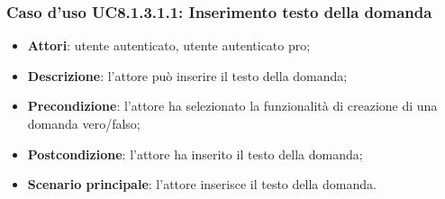 \subsubsection{Caso d'uso UC8.1.3.1.1: Inserimento testo della domanda}
	\begin{itemize}
		\item
			\textbf{Attori}: utente autenticato, utente autenticato pro;
		\item		
			\textbf{Descrizione}: l'attore può inserire il testo della domanda;
		\item
			\textbf{Precondizione}: l'attore ha selezionato la funzionalità di creazione di una domanda vero/falso; 
		\item
			\textbf{Postcondizione}: l'attore ha inserito il testo della domanda;
		\item
			\textbf{Scenario principale}: l'attore inserisce il testo della domanda. 
	 			
	\end{itemize}
	
